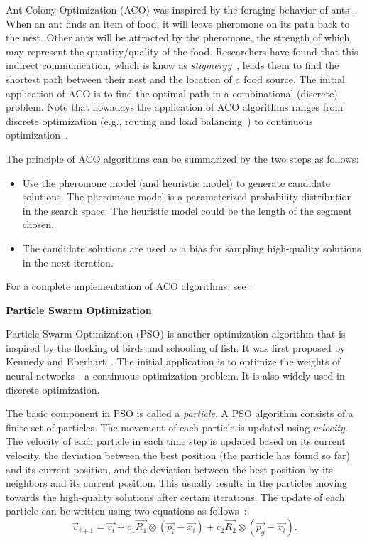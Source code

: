 Ant Colony Optimization (ACO) was inspired by the foraging behavior of ants \cite{dorigo2008ant}. When an ant finds an item of food, it will leave pheromone on its path back to the nest. Other ants will be attracted by the pheromone, the strength of which may represent the quantity/quality of the food. Researchers have found that this indirect communication, which is know as \textit{stigmergy}~\cite{Holland:AL:1999}, leads them to find the shortest path between their nest and the location of a food source. The initial application of ACO is to find the optimal path in a combinational (discrete) problem. Note that nowadays the application of ACO algorithms ranges from discrete optimization (e.g., routing and load balancing~\cite{DiCaro:JAIR:1998}) to continuous optimization~\cite{Dorigo:LNCS:2004}.   

The principle of ACO algorithms can be summarized by the two steps as follows:

\begin{itemize}
\item Use the pheromone model (and heuristic model) to generate candidate solutions. The pheromone model is a parameterized probability distribution in the search space. The heuristic model could be the length of the segment chosen.

\item The candidate solutions are used as a bias for sampling high-quality solutions in the next iteration.
\end{itemize}

For a complete implementation of ACO algorithms, see \cite{dorigo2008ant}. 


\textbf{Particle Swarm Optimization}

Particle Swarm Optimization (PSO) is another optimization algorithm that is inspired by the flocking of birds and schooling of fish. It was first proposed by Kennedy and Eberhart~\cite{Kennedy:ICNN:1995}. The initial application is to optimize the weights of neural networks---a continuous optimization problem. It is also widely used in discrete optimization. 

The basic component in PSO is called a \textit{particle}. A PSO algorithm consists of a finite set of particles. The movement of each particle is updated using \textit{velocity}. The velocity of each particle in each time step is updated based on its current velocity, the deviation between the best position (the particle has found so far) and its current position, and the deviation between the best position by its neighbors and its current position. This usually results in the particles moving towards the high-quality solutions after certain iterations. The update of each particle can be written using two equations as follows~\cite{Kennedy:ICNN:1995}:
\begin{equation}\label{eq:particle_velocity_update}
\overrightarrow{v}_{i+1} =  \overrightarrow{v_{i}} + c_1\overrightarrow{R_{1}}\otimes(\overrightarrow{p_{i}} - \overrightarrow{x_{i}}) + c_2\overrightarrow{R_{2}}\otimes(\overrightarrow{p_{g}} - \overrightarrow{x_{i}}). 
\end{equation} 


